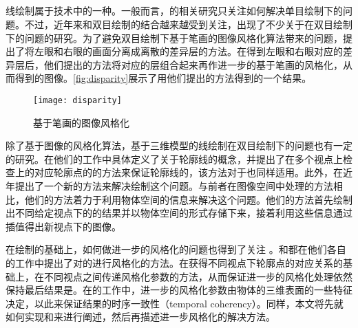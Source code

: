 \subsection{\stc{}\npr{}}

线绘制属于\npr{}技术中的一种。一般而言，\npr{}的相关研究只关注如何解决单目绘制下的问题。不过，近年来\npr{}和双目绘制的结合越来越受到关注，出现了不少关于\npr{}在双目绘制下的问题的研究。为了避免双目绘制下基于笔画的图像风格化算法\cite{hertzmann1998painterly}带来的问题，\citeauthor{northam2012consistent}\cite{northam2012consistent,northam2013stereoscopic}提出了将左眼和右眼的画面分离成离散的差异层的方法。在得到左眼和右眼对应的差异层后，他们提出的方法将对应的层组合起来再作进一步的基于笔画的风格化，从而得到\stc{}的图像。\autoref{fig:disparity}展示了用他们提出的方法得到的一个结果。

\begin{figure}[tbh]
    \centering
    \texttt{[image: disparity]}
    \caption{\label{fig:disparity}
    \stc{}基于笔画的图像风格化}
\end{figure}

除了基于图像的风格化算法，基于三维模型的线绘制在双目绘制下的问题也有一定的研究。\citeauthor{kim2013stereoscopic}在他们的工作中具体定义了关于轮廓线的\stc{}概念，并提出了在多个视点上检查\ec{}上的对应轮廓点的的方法来保证轮廓线的\stcy{}，该方法对于\scon{}也同样适用。此外，\citeauthor{bukenberger2018stereo}在近年提出了一个新的方法\cite{bukenberger2018stereo}来解决\stc{}\con{}绘制这个问题。与前者在图像空间中处理的方法相比，他们的方法着力于利用物体空间的信息来解决这个问题。他们的方法首先绘制出不同给定视点下的\con{}的结果并以物体空间的形式存储下来，接着利用这些信息通过插值得出新视点下\stc{}\con{}的图像。

在\stc{}\con{}绘制的基础上，如何做进一步的风格化的问题也得到了关注\cite{northrup2000artistic,kalnins2003coherent} 。\citeauthor{kim2013stereoscopic}和\citeauthor{bukenberger2018stereo}都在他们各自的工作中提出了对\stc{}的\con{}进行风格化的方法。在获得不同视点下轮廓点的对应关系的基础上，\citeauthor{kim2013stereoscopic}在不同视点之间传递风格化参数的方法，从而保证进一步的风格化处理依然保持最后结果是\stc{}。在\citeauthor{bukenberger2018stereo}的工作中，进一步的风格化参数由物体的三维表面的一些特征决定，以此来保证结果的时序一致性（temporal coherency）。同样，本文将先就如何实现\stc{}\con{}和\scon{}来进行阐述，然后再描述进一步风格化的解决方法。

\subsection{\ppll{}}


